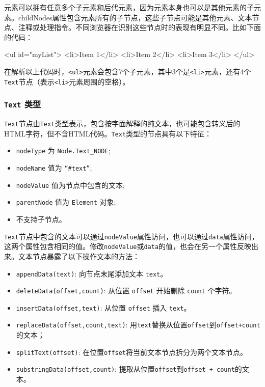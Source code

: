 元素可以拥有任意多个子元素和后代元素，因为元素本身也可以是其他元素的子元素。childNodes属性包含元素所有的子节点，这些子节点可能是其他元素、文本节点、注释或处理指令。不同浏览器在识别这些节点时的表现有明显不同。比如下面的代码：

\begin{HTML}
<ul id="myList">    
    <li>Item 1</li>   
    <li>Item 2</li>   
    <li>Item 3</li> 
</ul> 
\end{HTML}

在解析以上代码时，\texttt{<ul>}元素会包含7个子元素，其中3个是\texttt{<li>}元素，还有4个\texttt{Text}节点（表示\texttt{<li>}元素周围的空格）。

\subsubsection{\texttt{Text} 类型}

\texttt{Text}节点由\texttt{Text}类型表示，包含按字面解释的纯文本，也可能包含转义后的HTML字符，但不含HTML代码。\texttt{Text}类型的节点具有以下特征：

\begin{itemize}
    \item \texttt{nodeType} 为 \texttt{Node.Text\_NODE};
    \item \texttt{nodeName} 值为 \texttt{``\#text''};
    \item \texttt{nodeValue} 值为节点中包含的文本;
    \item \texttt{parentNode} 值为 \texttt{Element} 对象;
    \item 不支持子节点。
\end{itemize}

\texttt{Text}节点中包含的文本可以通过\texttt{nodeValue}属性访问，也可以通过\texttt{data}属性访问，这两个属性包含相同的值。修改\texttt{nodeValue}或\texttt{data}的值，也会在另一个属性反映出来。文本节点暴露了以下操作文本的方法：
\begin{itemize}
    \item \texttt{appendData(text)}: 向节点末尾添加文本 \texttt{text}。
    \item \texttt{deleteData(offset,count)}: 从位置 \texttt{offset} 开始删除 \texttt{count} 个字符。
    \item \texttt{insertData(offset,text)}: 从位置 \texttt{offset} 插入 \texttt{text}。
    \item \texttt{replaceData(offset,count,text)}: 用\texttt{text}替换从位置\texttt{offset}到\texttt{offset+count}的文本；
    \item \texttt{splitText(offset)}:  在位置\texttt{offset}将当前文本节点拆分为两个文本节点。
    \item \texttt{substringData(offset,count)}: 提取从位置\texttt{offset}到\texttt{offset + count}的文本。
\end{itemize}

